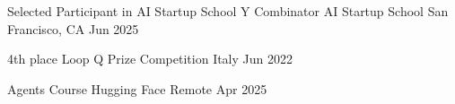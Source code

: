 



\begin{cvhonors}
  \cvhonor
    {Selected Participant in AI Startup School} %
    {Y Combinator AI Startup School} %
    {San Francisco, CA} %
    {Jun 2025} %

  \cvhonor
    {4th place} %
    {Loop Q Prize Competition} %
    {Italy} %
    {Jun 2022} %
\end{cvhonors}


\begin{cvhonors}
  \cvhonor
    {Agents Course} %
    {Hugging Face} %
    {Remote} %
    {Apr 2025} %
\end{cvhonors}
